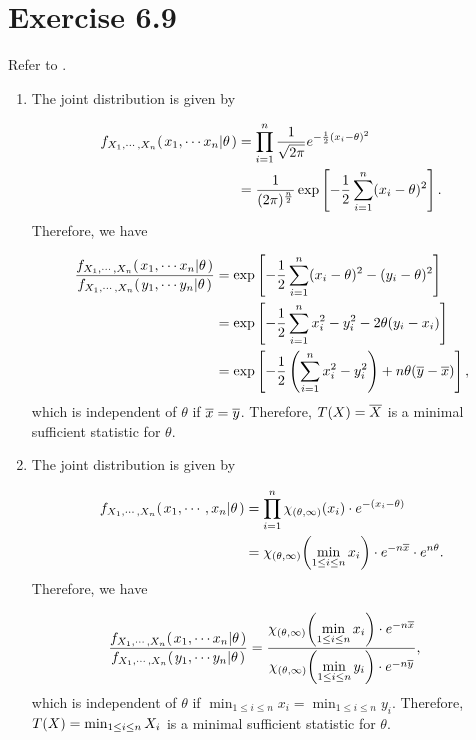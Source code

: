 \documentclass[12pt,letterpaper,reqno]{amsart}
\numberwithin{equation}{subsection}
\begin{document}
\newpage
\section{Exercise 6.9}

Refer to \cite[Theorem 6.2.13 on page 281]{Berger-Casella}.

\begin{enumerate}[label=(\alph*),leftmargin=*]
    \item The joint distribution is given by
    
    \begin{align*}
        {f_{X_1, \cdots, X_n}}\! \left( {\left. {x_1, \cdots x_n} \middle| {\theta} \right.} \right) &= \prod_{i=1}^n \frac{1}{\sqrt{2\pi} {}} e^{-\frac{1}{2} \left( {x_i-\theta} \right)^2} \\
        &= \frac{1}{(2 \pi)^{\frac{n}{2}}} \exp \left[ -\frac{1}{2} \sum_{i=1}^n (x_i- \theta)^2 \right].
    \end{align*}
    Therefore, we have
    
    \begin{align*}
        \frac{{f_{X_1, \cdots, X_n}}\! \left( {\left. {x_1, \cdots x_n} \middle| {\theta} \right.} \right)}{{f_{X_1, \cdots, X_n}}\! \left( {\left. {y_1, \cdots y_n} \middle| {\theta} \right.} \right)} &= \exp \left[ - \frac{1}{2} \sum_{i=1}^n (x_i - \theta)^2 - (y_i - \theta)^2 \right] \\
        &= \exp \left[ - \frac{1}{2} \sum_{i=1}^n x_i^2 - y_i^2 - 2\theta(y_i - x_i) \right] \\
        &= \exp \left[ - \frac{1}{2} \left( \sum_{i=1}^n x_i^2 - y_i^2 \right) + n \theta (\overline{{y}} - \overline{{x}}) \right],
    \end{align*}
    which is independent of $\theta$ if $\overline{{x}} = \overline{{y}}$. Therefore, ${T}\! \left( {X} \right) = \overline{{X}}$ is a minimal sufficient statistic for $\theta$.
    
    \item The joint distribution is given by
    
    \begin{align*}
        {f_{X_1, \cdots, X_n}}\! \left( {\left. {x_1, \cdots, x_n} \middle| {\theta} \right.} \right) &= \prod_{i=1}^n {\chi_{(\theta, \infty)}}\! \left( {x_i} \right) \cdot e^{-(x_i - \theta)} \\
        &= {\chi_{(\theta, \infty)}}\! \left( {\min_{1 \leq i \leq n} x_i} \right) \cdot e^{-n\overline{{x}}} \cdot e^{n \theta}.
    \end{align*}
    Therefore, we have
    
    \begin{align*}
        \frac{{f_{X_1, \cdots, X_n}}\! \left( {\left. {x_1, \cdots x_n} \middle| {\theta} \right.} \right)}{{f_{X_1, \cdots, X_n}}\! \left( {\left. {y_1, \cdots y_n} \middle| {\theta} \right.} \right)} &= \frac{{\chi_{(\theta, \infty)}}\! \left( {\displaystyle \min_{1 \leq i \leq n} x_i} \right) \cdot e^{-n\overline{{x}}}}{{\chi_{(\theta, \infty)}}\! \left( {\displaystyle \min_{1 \leq i \leq n} y_i} \right) \cdot e^{-n\overline{{y}}}},
    \end{align*}
    which is independent of $\theta$ if $\min_{1 \leq i \leq n} x_i = \min_{1 \leq i \leq n} y_i$. Therefore, ${T}\! \left( {X} \right) = \min_{1 \leq i \leq n} X_i$ is a minimal sufficient statistic for $\theta$.
    

\end{enumerate}
\end{document}
